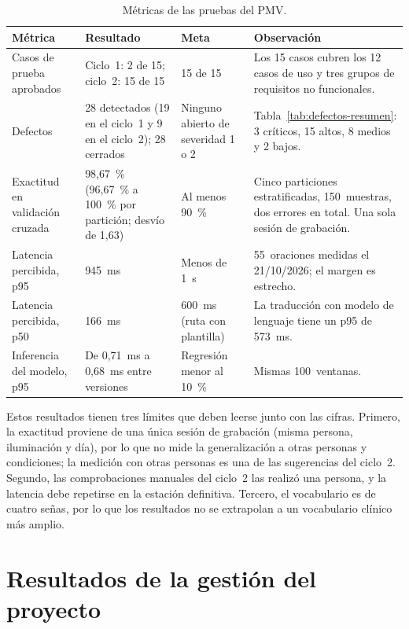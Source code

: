 \begin{table}[htbp]
\centering
\caption{Métricas de las pruebas del PMV.}\label{tab:metricas}
\footnotesize
\begin{tabularx}{\textwidth}{@{}p{4.3cm}p{3.2cm}p{2.6cm}X@{}}
\toprule
\textbf{Métrica} & \textbf{Resultado} & \textbf{Meta} & \textbf{Observación} \\
\midrule
Casos de prueba aprobados & Ciclo~1: 2 de 15; ciclo~2: 15 de 15 & 15 de 15 & Los 15 casos cubren los 12 casos de uso y tres grupos de requisitos no funcionales. \\
Defectos & 28 detectados (19 en el ciclo~1 y 9 en el ciclo~2); 28 cerrados & Ninguno abierto de severidad 1 o 2 & Tabla~\ref{tab:defectos-resumen}: 3 críticos, 15 altos, 8 medios y 2 bajos. \\
Exactitud en validación cruzada & 98,67~\% (96,67~\% a 100~\% por partición; desvío de 1,63) & Al menos 90~\% & Cinco particiones estratificadas, 150~muestras, dos errores en total. Una sola sesión de grabación. \\
Latencia percibida, p95 & 945~ms & Menos de 1~s & 55~oraciones medidas el 21/10/2026; el margen es estrecho. \\
Latencia percibida, p50 & 166~ms & 600~ms (ruta con plantilla) & La traducción con modelo de lenguaje tiene un p95 de 573~ms. \\
Inferencia del modelo, p95 & De 0,71~ms a 0,68~ms entre versiones & Regresión menor al 10~\% & Mismas 100~ventanas. \\
\bottomrule
\end{tabularx}
\end{table}

Estos resultados tienen tres límites que deben leerse junto con las cifras. Primero, la exactitud proviene de una única sesión de grabación (misma persona, iluminación y día), por lo que no mide la generalización a otras personas y condiciones; la medición con otras personas es una de las sugerencias del ciclo~2. Segundo, las comprobaciones manuales del ciclo~2 las realizó una persona, y la latencia debe repetirse en la estación definitiva. Tercero, el vocabulario es de cuatro señas, por lo que los resultados no se extrapolan a un vocabulario clínico más amplio.

\section{Resultados de la gestión del proyecto}\label{sec:res-gestion}

